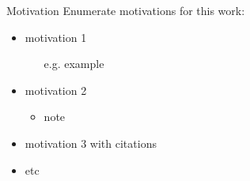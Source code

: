 \documentclass[presentation]{beamer}\mode<presentation>{\usetheme{blackAMSBolognaFC}}
\begin{document}
\begin{frame}[c]{Motivation}
    Enumerate motivations for this work:
    \vfill
    \begin{itemize}
        \item motivation 1
        \begin{itemize}
            \item[e.g.] example
        \end{itemize}
        
        \vfill
        
        \item motivation 2
        \begin{itemize}
            \item note
        \end{itemize}
        
        \vfill
        
        \item motivation 3 with citations 
        
        \vfill
        
        \item etc
        
    \end{itemize}
\end{frame}
\end{document}
